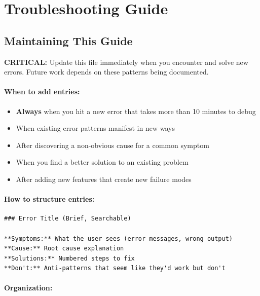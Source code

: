 
\section{Troubleshooting Guide}
\label{sec:troubleshooting}

\subsection{Maintaining This Guide}
\label{sec:maintaining-guide}

\textbf{CRITICAL:} Update this file immediately when you encounter and solve new errors. Future work depends on these patterns being documented.

\paragraph{When to add entries:}

\begin{itemize}
  \item \textbf{Always} when you hit a new error that takes more than 10 minutes to debug
  \item When existing error patterns manifest in new ways
  \item After discovering a non-obvious cause for a common symptom
  \item When you find a better solution to an existing problem
  \item After adding new features that create new failure modes
\end{itemize}

\paragraph{How to structure entries:}

\begin{lstlisting}[style=bash]
### Error Title (Brief, Searchable)

**Symptoms:** What the user sees (error messages, wrong output)
**Cause:** Root cause explanation
**Solutions:** Numbered steps to fix
**Don't:** Anti-patterns that seem like they'd work but don't
\end{lstlisting}

\paragraph{Organization:}

